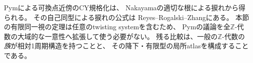 Pym\cite[\S2.2, Definition~2.8]{Pym}による可換点近傍のCY規格化は、
Nakayamaの適切な根による捩れから得られる。
その自己同型による捩れの公式は
Reyes--Rogalski--Zhang\cite[Theorem~0.3]{RRZHomological}にある。
本節の有限同一視の定理は任意のtwisting systemを含むため、
Pymの議論を全$\mathbb Z$-代数の大域的な一意性へ拡張して使う必要がない。
残る比較は、一般の$\mathbb Z$-代数の\emph{族}が相対1周期構造を持つことと、
その降下・有限型の局所atlasを構成することである。
